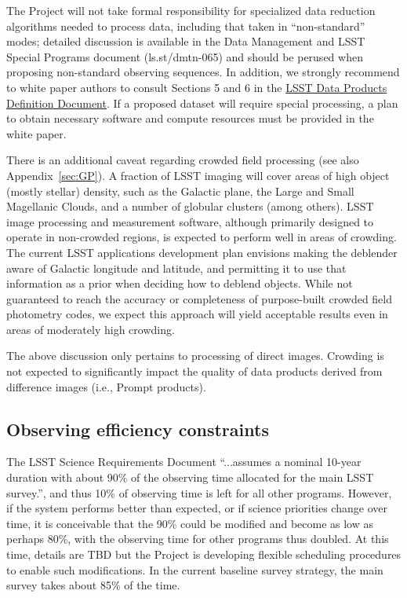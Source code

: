 \documentclass[DM,lsstdraft,toc,usenatbib]{lsstdoc}
\begin{document}
The Project will not take formal responsibility for specialized data reduction algorithms 
needed to process data, including that taken in ``non-standard'' modes; detailed discussion is 
available in the Data Management and LSST Special Programs document (ls.st/dmtn-065) and should
be perused when proposing non-standard observing sequences. In addition, we strongly recommend 
to white paper authors to 
consult Sections 5 and 6 in the \href{http://ls.st/dpdd}{LSST Data Products Definition Document}. If 
a proposed dataset will require special processing, a plan to obtain necessary software and compute resources 
must be provided in the white paper. 

There is an additional caveat regarding crowded field processing (see also Appendix~\ref{sec:GP}). 
A fraction of LSST imaging will cover areas of high object (mostly stellar) density, such as the 
Galactic plane, the Large and Small Magellanic Clouds, and a number of globular clusters (among 
others). LSST image processing and measurement software, although primarily designed to operate 
in non-crowded regions, is expected to perform well in areas of crowding. The current LSST applications 
development plan envisions making the deblender aware of Galactic longitude and latitude, and 
permitting it to use that information as a prior when deciding how to deblend objects. While not 
guaranteed to reach the accuracy or completeness of purpose-built crowded field photometry codes, 
we expect this approach will yield acceptable results even in areas of moderately high crowding.

The above discussion only pertains to processing of direct images. Crowding is not expected to 
significantly impact the quality of data products derived from difference images (i.e., Prompt 
products).


\subsection{Observing efficiency constraints} 

The LSST Science Requirements Document  ``...assumes a nominal 10-year duration with about 90\% 
of the observing time allocated for the main LSST survey.'', and thus 10\% of observing time is left for 
all other programs. However, if the system performs better than expected, or if science priorities 
change over time, it is conceivable that the 90\% could be modified and become as low as perhaps 80\%, 
with the observing time for other programs thus doubled. At this time, details are TBD but the Project
is developing flexible scheduling procedures to enable such modifications. In the current baseline
survey strategy, the main survey takes about 85\% of the time. 
\end{document}
